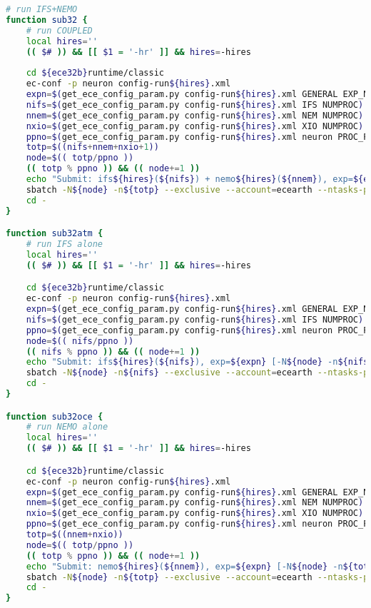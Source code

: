 \begin{lstlisting}[caption={Run functions},label={app:run},language=Bash]
# run IFS+NEMO
function sub32 {
    # run COUPLED
    local hires=''
    (( $# )) && [[ $1 = '-hr' ]] && hires=-hires
    
    cd ${ece32b}runtime/classic
    ec-conf -p neuron config-run${hires}.xml
    expn=$(get_ece_config_param.py config-run${hires}.xml GENERAL EXP_NAME)  ||  return 1
    nifs=$(get_ece_config_param.py config-run${hires}.xml IFS NUMPROC)    ||  return 1
    nnem=$(get_ece_config_param.py config-run${hires}.xml NEM NUMPROC)    ||  return 1
    nxio=$(get_ece_config_param.py config-run${hires}.xml XIO NUMPROC)    ||  return 1
    ppno=$(get_ece_config_param.py config-run${hires}.xml neuron PROC_PER_NODE) ||  return 1 
    totp=$((nifs+nnem+nxio+1))
    node=$(( totp/ppno ))
    (( totp % ppno )) && (( node+=1 ))
    echo "Submit: ifs${hires}(${nifs}) + nemo${hires}(${nnem}), exp=${expn} [-N${node} -n${totp} --ntasks-per-node=${ppno}]"
    sbatch -N${node} -n${totp} --exclusive --account=ecearth --ntasks-per-node=${ppno} -o "out/${expn}${hires}.out.001" -e "out/${expn}${hires}.err.001" ./ece-ifs+nemo.sh
    cd -
}

function sub32atm {
    # run IFS alone
    local hires=''
    (( $# )) && [[ $1 = '-hr' ]] && hires=-hires

    cd ${ece32b}runtime/classic
    ec-conf -p neuron config-run${hires}.xml
    expn=$(get_ece_config_param.py config-run${hires}.xml GENERAL EXP_NAME)  ||  return 1
    nifs=$(get_ece_config_param.py config-run${hires}.xml IFS NUMPROC)    ||  return 1
    ppno=$(get_ece_config_param.py config-run${hires}.xml neuron PROC_PER_NODE) ||  return 1
    node=$(( nifs/ppno ))
    (( nifs % ppno )) && (( node+=1 ))
    echo "Submit: ifs${hires}(${nifs}), exp=${expn} [-N${node} -n${nifs} --ntasks-per-node=${ppno}]"
    sbatch -N${node} -n${nifs} --exclusive --account=ecearth --ntasks-per-node=${ppno} -o "out/${expn}${hires}.out.001" -e "out/${expn}${hires}.err.001" ./ece-ifs.sh
    cd -
}

function sub32oce {
    # run NEMO alone
    local hires=''
    (( $# )) && [[ $1 = '-hr' ]] && hires=-hires

    cd ${ece32b}runtime/classic
    ec-conf -p neuron config-run${hires}.xml
    expn=$(get_ece_config_param.py config-run${hires}.xml GENERAL EXP_NAME)  ||  return 1
    nnem=$(get_ece_config_param.py config-run${hires}.xml NEM NUMPROC)    ||  return 1
    nxio=$(get_ece_config_param.py config-run${hires}.xml XIO NUMPROC)    ||  return 1
    ppno=$(get_ece_config_param.py config-run${hires}.xml neuron PROC_PER_NODE) ||  return 1
    totp=$((nnem+nxio))
    node=$(( totp/ppno ))
    (( totp % ppno )) && (( node+=1 ))
    echo "Submit: nemo${hires}(${nnem}), exp=${expn} [-N${node} -n${totp} --ntasks-per-node=${ppno}]"
    sbatch -N${node} -n${totp} --exclusive --account=ecearth --ntasks-per-node=${ppno} -o "out/${expn}${hires}.out.001" -e "out/${expn}${hires}.err.001" ./ece-nemo.sh
    cd -
}

\end{lstlisting}


\printglossaries